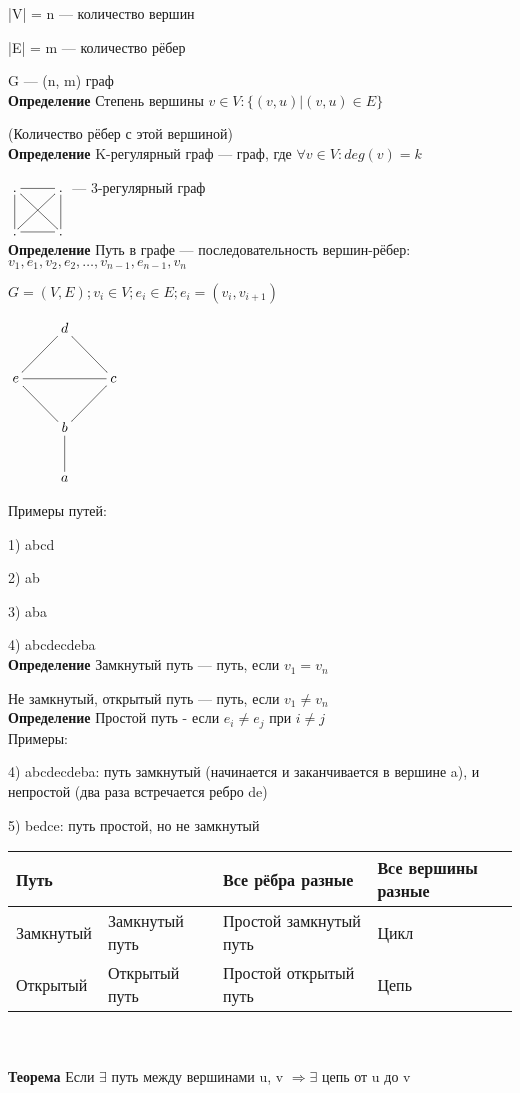 \documentclass[a4paper, 12pt] {article}
\begin{document}
|V| = n --- количество вершин

|E| = m --- количество рёбер

G --- (n, m) граф\\


\textbf{Определение}
Степень вершины $v \in V: \{ (v, u) | (v, u) \in E \}$ 

(Количество рёбер с этой вершиной)\\

\textbf{Определение}
K-регулярный граф --- граф, где $\forall v \in V: deg (v) = k $

$\xymatrix{
	. \ar@{-}[r] \ar@{-}[rd] & . \ar@{-}[d] \ar@{-}[ld]\\
	. \ar@{-}[u] \ar@{-}[r]  & . \\ 
}$
--- 3-регулярный граф\\

\textbf{Определение}
Путь в графе --- последовательность вершин-рёбер: $v_{1}, e_{1}, v_{2}, e_{2}, \dots, v_{n-1}, e_{n-1}, v_{n}$

$G=(V, E); v_{i} \in V; e_{i} \in E; e_{i} = (v_{i}, v_{i+1})$

$\xymatrix{
	& d \ar@{-}[rd] \ar@{-}[ld] \\
	e \ar@{-}[rr] & & c \\ 
	& b \ar@{-}[ru] \ar@{-}[lu]\\
	& a \ar@{-}[u]\\
}$

Примеры путей:

1) abcd

2) ab

3) aba

4) abcdecdeba\\

\textbf{Определение}
Замкнутый путь --- путь, если $v_{1} = v_{n}$

Не замкнутый, открытый путь --- путь, если $v_{1} \ne v_{n}$\\

\textbf{Определение}
Простой путь - если $e_{i} \ne e_{j}$ при $i \ne j$\\

Примеры:

4) abcdecdeba: путь замкнутый (начинается и заканчивается в вершине a), и непростой (два раза встречается ребро de)

5) bedce: путь простой, но не замкнутый


\begin{tabular}{ | l |l | l | l | }
	\hline
	Путь & & Все рёбра разные & Все вершины разные \\ \hline
	Замкнутый & Замкнутый путь & Простой замкнутый путь & Цикл\\ \hline
	Открытый & Открытый путь & Простой открытый путь & Цепь \\ \hline
\end{tabular}
\\
\\
\textbf{Теорема}
Если $\exists$ путь между вершинами u, v $\Rightarrow \exists$ цепь от u до v\\
\end{document}
